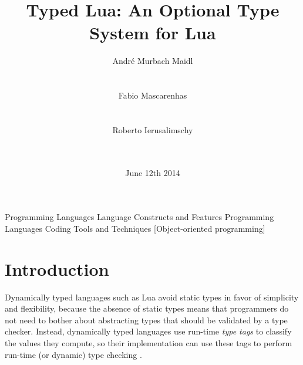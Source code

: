 \documentclass[preprint]{sig-alternate}
\begin{document}

\title{Typed Lua: An Optional Type System for Lua}


\author{
\alignauthor
André Murbach Maidl\\
  \\
  \\
\alignauthor
Fabio Mascarenhas\\
  \\
  \\
\alignauthor
Roberto Ierusalimschy\\
  \\
  \\
}

\date{June 12th 2014}

\maketitle

\begin{abstract}
\end{abstract}

         {Programming Languages}
         {Language Constructs and Features}
         {Programming Languages}
         {Coding Tools and Techniques}
         [Object-oriented programming]



\section{Introduction} \label{sec:intro}

Dynamically typed languages such as Lua avoid static types in favor of
simplicity and flexibility, because the absence of static types means
that programmers do not need to bother about abstracting types that
should be validated by a type checker.
Instead, dynamically typed languages use run-time \textit{type tags}
to classify the values they compute, so their implementation can use
these tags to perform run-time (or dynamic) type checking
\cite{pierce2002tpl}.
\end{document}
